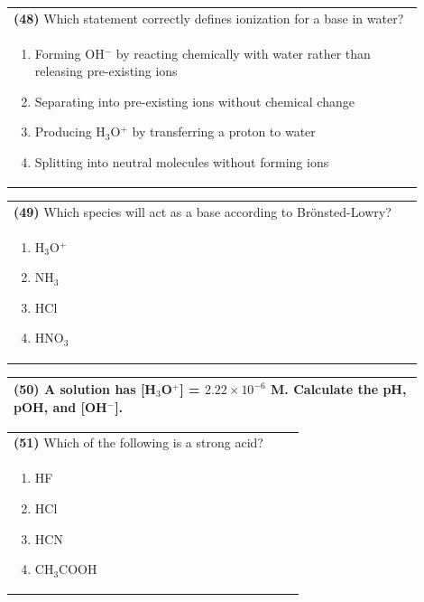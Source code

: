 \documentclass{article}
\begin{document}
\noindent\begin{tabular}{|p{0.9\linewidth}|}
\hline
\textbf{(48)} Which statement correctly defines ionization for a base in water? \\[0.2cm]
\begin{minipage}[t]{0.85\linewidth}
\begin{enumerate}[label=\alph*.]
\item Forming OH$^-$ by reacting chemically with water rather than releasing pre-existing ions
\item Separating into pre-existing ions without chemical change
\item Producing H$_3$O$^+$ by transferring a proton to water
\item Splitting into neutral molecules without forming ions
\end{enumerate}
\end{minipage}\\[0.2cm]
\hline
\end{tabular}
\newpage

\noindent\begin{tabular}{|p{0.9\linewidth}|}
\hline
\textbf{(49)} Which species will act as a base according to Brönsted-Lowry? \\[0.2cm]
\begin{minipage}{0.85\linewidth}
\begin{enumerate}[label=\alph*.]
\item H$_3$O$^+$ \item NH$_3$ \item HCl \item HNO$_3$
\end{enumerate}
\end{minipage}\\[0.2cm]
\hline
\end{tabular}

\noindent\begin{tabular}{|p{0.9\linewidth}|}
\hline
\textbf{(50)} A solution has [H$_3$O$^+$] = $2.22\times10^{-6}$ M. Calculate the pH, pOH, and [OH$^-$]. \\[4cm]
\hline
\end{tabular}

\noindent\begin{tabular}{|p{0.9\linewidth}|}
\hline
\textbf{(51)} Which of the following is a strong acid? \\[0.2cm]
\begin{minipage}[t]{0.85\linewidth}
\begin{enumerate}[label=\alph*.]
\item HF \item HCl \item HCN \item CH$_3$COOH
\end{enumerate}
\end{minipage}\\[0.2cm]
\hline
\end{tabular}
\end{document}
